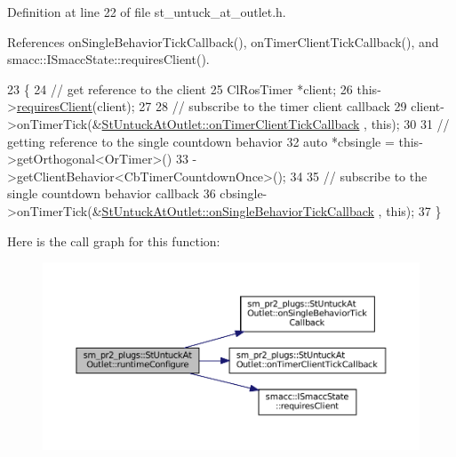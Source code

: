 Definition at line 22 of file st\+\_\+untuck\+\_\+at\+\_\+outlet.\+h.



References on\+Single\+Behavior\+Tick\+Callback(), on\+Timer\+Client\+Tick\+Callback(), and smacc\+::\+I\+Smacc\+State\+::requires\+Client().


\begin{DoxyCode}
23     \{
24         \textcolor{comment}{// get reference to the client}
25         ClRosTimer *client;
26         this->\hyperlink{classsmacc_1_1ISmaccState_a7f95c9f0a6ea2d6f18d1aec0519de4ac}{requiresClient}(client);
27 
28         \textcolor{comment}{// subscribe to the timer client callback}
29         client->onTimerTick(&\hyperlink{structsm__pr2__plugs_1_1StUntuckAtOutlet_a51a908bc8b1908d8e548db64bc8a5528}{StUntuckAtOutlet::onTimerClientTickCallback}
      , \textcolor{keyword}{this});
30 
31         \textcolor{comment}{// getting reference to the single countdown behavior}
32         \textcolor{keyword}{auto} *cbsingle = this->getOrthogonal<OrTimer>()
33                              ->getClientBehavior<CbTimerCountdownOnce>();
34 
35         \textcolor{comment}{// subscribe to the single countdown behavior callback}
36         cbsingle->onTimerTick(&\hyperlink{structsm__pr2__plugs_1_1StUntuckAtOutlet_a6a0c321350c11e8f393c34e7c85bf36a}{StUntuckAtOutlet::onSingleBehaviorTickCallback}
      , \textcolor{keyword}{this});
37     \}
\end{DoxyCode}
Here is the call graph for this function\+:
\nopagebreak
\begin{figure}[H]
\begin{center}
\leavevmode
\includegraphics[width=350pt]{structsm__pr2__plugs_1_1StUntuckAtOutlet_a14d6ec782f8d78b6df0ef610508b0e9b_cgraph}
\end{center}
\end{figure}
\mbox{\label{structsm__pr2__plugs_1_1StUntuckAtOutlet_a7ec4bd71b7f8b5ce3b5229111c9afd2d}} 
